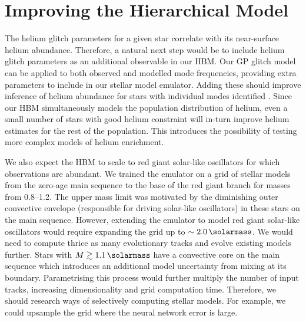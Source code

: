 
\section*{Improving the Hierarchical Model}

The helium glitch parameters for a given star correlate with its near-surface helium abundance. Therefore, a natural next step would be to include helium glitch parameters as an additional observable in our HBM. Our GP glitch model can be applied to both observed and modelled mode frequencies, providing extra parameters to include in our stellar model emulator. Adding these should improve inference of helium abundance for stars with individual modes identified \citep[e.g.][]{Davies.SilvaAguirre.ea2016,Lund.SilvaAguirre.ea2017}. Since our HBM simultaneously models the population distribution of helium, even a small number of stars with good helium constraint will in-turn improve helium estimates for the rest of the population. This introduces the possibility of testing more complex models of helium enrichment.

We also expect the HBM to scale to red giant solar-like oscillators for which observations are abundant. We trained the emulator on a grid of stellar models from the zero-age main sequence to the base of the red giant branch for masses from \SIrange{0.8}{1.2}{\solarmass}. The upper mass limit was motivated by the diminishing outer convective envelope (responsible for driving solar-like oscillators) in these stars on the main sequence. However, extending the emulator to model red giant solar-like oscillators would require expanding the grid up to \(\sim\SI{2.0}{\solarmass}\). We would need to compute thrice as many evolutionary tracks and evolve existing models further. Stars with \(M \gtrsim \SI{1.1}{\solarmass}\) have a convective core on the main sequence which introduces an additional model uncertainty from mixing at its boundary. Parametrising this process would further multiply the number of input tracks, increasing dimensionality and grid computation time. Therefore, we should research ways of selectively computing stellar models. For example, we could upsample the grid \citep[e.g.][]{Li.Davies.ea2022} where the neural network error is large.

